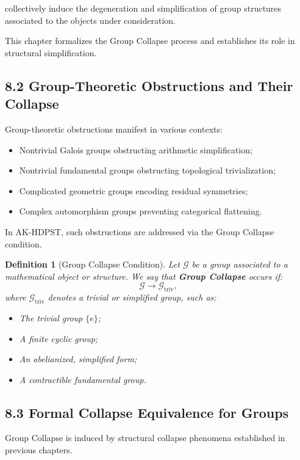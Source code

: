 \documentclass[11pt]{article}
\newtheorem{definition}[theorem]{Definition}
\begin{document}
collectively induce the degeneration and simplification of group structures associated to the objects under consideration.

This chapter formalizes the Group Collapse process and establishes its role in structural simplification.

\subsection*{8.2 Group-Theoretic Obstructions and Their Collapse}

Group-theoretic obstructions manifest in various contexts:

\begin{itemize}
    \item Nontrivial Galois groups obstructing arithmetic simplification;
    \item Nontrivial fundamental groups obstructing topological trivialization;
    \item Complicated geometric groups encoding residual symmetries;
    \item Complex automorphism groups preventing categorical flattening.
\end{itemize}

In AK-HDPST, such obstructions are addressed via the Group Collapse condition.

\begin{definition}[Group Collapse Condition]
Let \( \mathcal{G} \) be a group associated to a mathematical object or structure. We say that \textbf{Group Collapse} occurs if:
\[
\mathcal{G} \longrightarrow \mathcal{G}_{\mathrm{triv}},
\]
where \( \mathcal{G}_{\mathrm{triv}} \) denotes a trivial or simplified group, such as:

\begin{itemize}
    \item The trivial group \( \{e\} \);
    \item A finite cyclic group;
    \item An abelianized, simplified form;
    \item A contractible fundamental group.
\end{itemize}
\end{definition}

\subsection*{8.3 Formal Collapse Equivalence for Groups}

Group Collapse is induced by structural collapse phenomena established in previous chapters.
\end{document}
